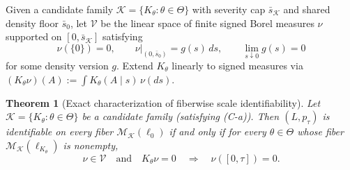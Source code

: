 \documentclass[11pt]{article}
\theoremstyle{plain}
\newtheorem{theorem}{Theorem}
\theoremstyle{definition}
\theoremstyle{remark}
\begin{document}
Given a candidate family $\mathcal{K} = \{K_\theta : \theta \in \Theta\}$ with severity cap $\bar s_{\mathcal{K}}$ and shared density floor $\bar s_0$, let $\mathcal{V}$ be the linear space of finite signed Borel measures $\nu$ supported on $[0, \bar s_{\mathcal{K}}]$ satisfying
\[
\nu(\{0\}) = 0, \qquad
\nu|_{(0, \bar s_0)} = g(s)\,ds, \qquad
\lim_{s \downarrow 0} g(s) = 0
\]
for some density version $g$. Extend $K_\theta$ linearly to signed measures via $(K_\theta \nu)(A) := \int K_\theta(A \mid s)\,\nu(ds)$.

\begin{theorem}[Exact characterization of fiberwise scale identifiability]\label{thm:char}
Let $\mathcal{K} = \{K_\theta : \theta \in \Theta\}$ be a candidate family (satisfying \textup{(C-a)}). Then $(L, p_\tau)$ is identifiable on every fiber $\mathcal{M}_{\mathcal{K}}(\ell_0)$ if and only if for every $\theta \in \Theta$ whose fiber $\mathcal{M}_{\mathcal{K}}(\ell_{K_\theta})$ is nonempty,
\begin{equation}\label{eq:exact-cond}
\nu \in \mathcal{V} \quad \text{and} \quad K_\theta \nu = 0 \quad \Longrightarrow \quad \nu([0, \tau]) = 0.
\end{equation}
\end{theorem}
\end{document}

